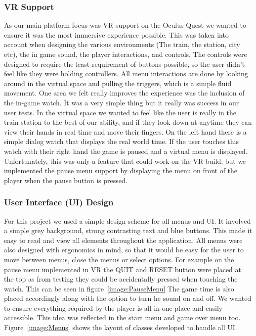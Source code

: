 \subsubsection{VR Support}
As our main platform focus was VR support on the Oculus Quest we wanted to ensure it was the most immersive experience possible. This was taken into account when designing the various environments (The train, the station, city etc), the in game sound, the player interactions, and controls. The controls were designed to require the least requirement of buttons possible, so the user didn't feel like they were holding controllers. All menu interactions are done by looking around in the virtual space and pulling the triggers, which is a simple fluid movement. One area we felt really improves the experience was the inclusion of the in-game watch. It was a very simple thing but it really was success in our user tests. In the virtual space we wanted to feel like the user is really in the train station to the best of our ability, and if they look down at anytime they can view their hands in real time and move their fingers. On the left hand there is a simple dialog watch that displays the real world time. If the user touches this watch with their right hand the game is paused and a virtual menu is displayed. Unfortunately, this was only a feature that could work on the VR build, but we implemented the pause menu support by displaying the menu on front of the player when the pause button is pressed.

\subsubsection{User Interface (UI) Design}
For this project we used a simple design scheme for all menus and UI. It involved a simple grey background, strong contrasting text and blue buttons. This made it easy to read and view all elements throughout the application. All menus were also designed with ergonomics in mind, so that it would be easy for the user to move between menus, close the menus or select options. For example on the pause menu implemented in VR the QUIT and RESET button were placed at the top as from testing they could be accidentally pressed when touching the watch. This can be seen in figure~\ref{image:PauseMenu} The game time is also placed accordingly along with the option to turn he sound on and off. We wanted to ensure everything required by the player is all in one place and easily accessible. This idea was reflected in the start menu and game over menu too. Figure~\ref{image:Menus} shows the layout of classes developed to handle all UI.

